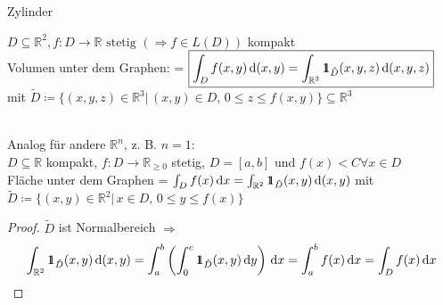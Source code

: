 \begin{minipage}{0.333\textwidth}
    Zylinder
\end{minipage}
\begin{minipage}{0.666\textwidth}
    $D\subseteq\mathbb{R}^2, f\colon D\to\mathbb{R} \text{ stetig } (\Rightarrow f \in L(D))$ kompakt\\
    Volumen unter dem Graphen: = $\boxed{\int_D f(x,y) \, \text{d}(x,y) = \int_{\mathbb{R}^3} \id_{\tilde{D}}(x,y,z)\,\text{d}(x,y,z)}$ mit $\tilde{D}\coloneqq \{(x,y,z)\in\mathbb{R}^3 |\, (x,y)\in D, \,0 \leq z\leq f(x,y)\}\subseteq \mathbb{R}^3$ 
\end{minipage}
\\
Analog für andere $\mathbb{R}^n$, z. B. $n=1$:\\
$D\subseteq\mathbb{R}$ kompakt, $f\colon D\to\mathbb{R}_{\geq 0}$ stetig, $D=[a,b]$ und $f(x) < C \forall x\in D$\\
Fläche unter dem Graphen = $\integ{D}{f(x)} = \int_{\mathbb{R}^2} \id_{\tilde{D}}(x,y) \,\text{d}(x,y)$ mit $\tilde{D}\coloneqq\{(x,y)\in \mathbb{R}^2 |\, x\in D, \, 0\leq y\leq f(x)\}$
\begin{proof}
    $\tilde{D}$ ist Normalbereich $\Rightarrow$\begin{align*}
        \int_{\mathbb{R}^2} \id_{\tilde{D}}(x,y)\,\text{d}(x,y) = \int_a^b\left(\int_0^c \id_{\tilde{D}}(x,y)\,\text{d}y\right)\,\text{d}x = \int_a^b f(x) \,\text{d}x = \integ{D}{f(x)}
    \end{align*}
\end{proof}

